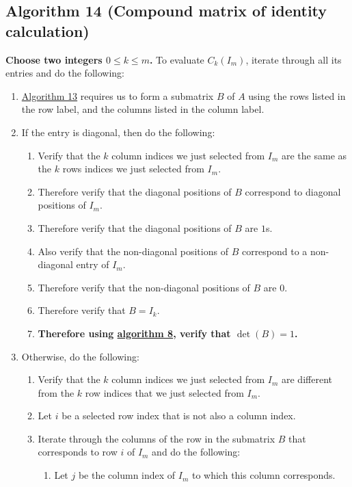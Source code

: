 \documentclass[twocolumn]{article}
\begin{document}
		\subsection{Algorithm 14 (Compound matrix of identity calculation)}\label{sec:algorithm 14}
			\textbf{Choose two integers $0\le k\le m$.} To evaluate $C_k(I_m)$, iterate through all its entries and do the following:
			\begin{enumerate}
				\item \hyperref[sec:algorithm 13]{Algorithm 13} requires us to form a submatrix $B$ of $A$ using the rows listed in the row label, and the columns listed in the column label.
				\item If the entry is diagonal, then do the following:
				\begin{enumerate}
					\item Verify that the $k$ column indices we just selected from $I_m$ are the same as the $k$ rows indices we just selected from $I_m$.
					\item Therefore verify that the diagonal positions of $B$ correspond to diagonal positions of $I_m$.
					\item Therefore verify that the diagonal positions of $B$ are $1$s.
					\item Also verify that the non-diagonal positions of $B$ correspond to a non-diagonal entry of $I_m$.
					\item Therefore verify that the non-diagonal positions of $B$ are $0$.
					\item Therefore verify that $B=I_k$.
					\item \textbf{Therefore using \hyperref[sec:algorithm 8]{algorithm 8}, verify that $\det(B)=1$.}
				\end{enumerate}
				\item Otherwise, do the following:
				\begin{enumerate}
					\item Verify that the $k$ column indices we just selected from $I_m$ are different from the $k$ row indices that we just selected from $I_m$.
					\item Let $i$ be a selected row index that is not also a column index.
					\item Iterate through the columns of the row in the submatrix $B$ that corresponds to row $i$ of $I_m$ and do the following:
					\begin{enumerate}
						\item Let $j$ be the column index of $I_m$ to which this column corresponds.

\end{enumerate}
\end{enumerate}
\end{enumerate}
\end{document}
